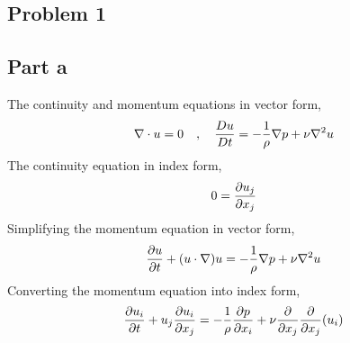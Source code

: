 \documentclass[class=report, 12pt, crop=false]{standalone}
\begin{document}
\begin{center}

\section{Problem 1}
\begin{comment}
\end{comment}
\subsection{Part a}
\begin{comment}
\end{comment}
The continuity and momentum equations in vector form,
$$\nabla\cdot u=0 \quad,\quad \frac{Du}{Dt} = -\frac{1}{\rho}\nabla p + \nu\nabla^2 u$$
The continuity equation in index form,
$$0 = \frac{\partial u_j}{\partial x_j}$$
Simplifying the momentum equation in vector form,
$$\frac{\partial u}{\partial t} + (u\cdot\nabla)u = -\frac{1}{\rho}\nabla p + \nu\nabla^2 u$$
Converting the momentum equation into index form,
$$\frac{\partial u_i}{\partial t} + u_j\frac{\partial u_i}{\partial x_j} = -\frac{1}{\rho}\frac{\partial p}{\partial x_i} + \nu\frac{\partial}{\partial x_j}\frac{\partial}{\partial x_j}(u_i)$$

\end{center}
\end{document}
